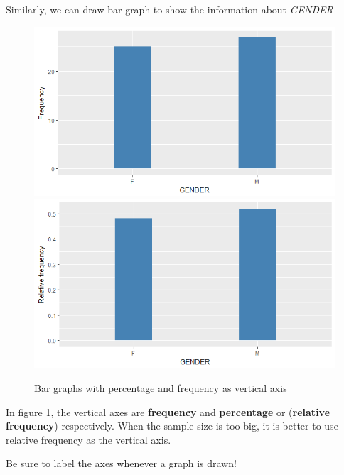 \documentclass[a4paper, 12pt,twoside]{book}
\begin{document}
\begin{itemize}
Similarly, we can draw bar graph to show the information about \textit{GENDER}
    \begin{figure}[H]
      \centering
        \includegraphics[scale=0.4]{Bargraph1.png}
        \includegraphics[scale=0.4]{Bargraph2.png}       
          \caption{Bar graphs with percentage and frequency as vertical axis} 
          \label{bargraph}
    \end{figure}    
 In figure \ref{bargraph}, the vertical axes are \textbf{frequency} and  \textbf{percentage} or (\textbf{relative frequency}) respectively. When the sample size is too big, it is better to use relative frequency as the vertical axis.
 
\colorbox{babypink}{\parbox{15.2cm}{Be sure to label the axes whenever a graph is drawn!}}


\end{itemize}
\end{document}
